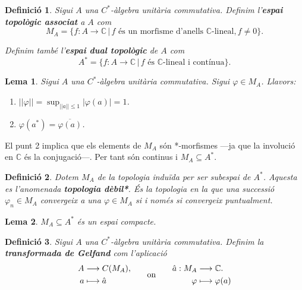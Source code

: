 \documentclass{article}
\newtheorem{lema}{Lema}
\newtheorem{definicio}{Definici\'{o}}
\theoremstyle{definition}
\begin{document}
\begin{definicio}
Sigui $A$ una $C^*$-\`{a}lgebra unit\`{a}ria commutativa. Definim l'\textbf{espai topol\`{o}gic associat} a $A$ com
\[M_A=\{f:A\rightarrow\mathbb{C}\,|\,f\text{ \'{e}s un morfisme d'anells }\mathbb{C}\text{-lineal},f\neq0\}.\]

Definim tamb\'{e} l'\textbf{espai dual topol\`{o}gic} de $A$ com
\[A^*=\{f:A\rightarrow\mathbb{C}\,|\,f\text{ \'{e}s }\mathbb{C}\text{-lineal i cont\'{i}nua}\}.\]
\end{definicio}

\begin{lema}
Sigui $A$ una $C^*$-\`{a}lgebra unit\`{a}ria commutativa. Sigui $\varphi\in M_A$. Llavors:
\begin{enumerate}
\item $\displaystyle{||\varphi||=\sup_{||a||\leq1}|\varphi(a)|=1}$.
\item $\varphi(a^*)=\overline{\varphi(a)}$.
\end{enumerate}
\end{lema}

El punt 2 implica que els elements de $M_A$ s\'{o}n *-morfismes ---ja que la involuci\'{o} en $\mathbb{C}$ \'{e}s la conjugaci\'{o}---. Per tant s\'{o}n continus i $M_A\subseteq A^*$.

\begin{definicio}
Dotem $M_A$ de la topologia indu\"{i}da per ser subespai de $A^*$. Aquesta es l'anomenada \textbf{topologia d\`{e}bil*}. \'{E}s la topologia en la que una successi\'{o} $\varphi_n\in M_A$ convergeix a una $\varphi\in M_A$ si i nom\'{e}s si convergeix puntualment.
\end{definicio}

\begin{lema}
$M_A\subseteq A^*$ \'{e}s un espai compacte.
\end{lema}

\begin{definicio}
Sigui $A$ una $C^*$-\`{a}lgebra unit\`{a}ria commutativa. Definim la \textbf{transformada de Gelfand} com l'aplicaci\'{o}
\[\begin{split}A&\longrightarrow C(M_A),\\a&\longmapsto\hat{a}\end{split}\hspace{7mm}\text{on}\hspace{7mm}\begin{split}\hat{a}:M_A&\longrightarrow\mathbb{C}.\\\varphi&\longmapsto\varphi(a)\end{split}\]
\end{definicio}
\end{document}
